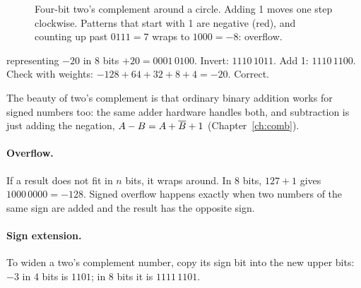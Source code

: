 \begin{figure}[h]
\centering
{}
\caption{Four-bit two's complement around a circle. Adding 1 moves one step clockwise. Patterns that start with 1 are negative (red), and counting up past $0111 = 7$ wraps to $1000 = -8$: overflow.}
\label{fig:twoswheel}
\end{figure}

\begin{worked}{representing $-20$ in 8 bits}
$+20 = 0001\,0100$. Invert: $1110\,1011$. Add 1: $1110\,1100$. Check with weights: $-128 + 64 + 32 + 8 + 4 = -20$. Correct.
\end{worked}

The beauty of two's complement is that ordinary binary addition works for signed numbers too: the same adder hardware handles both, and subtraction is just adding the negation, $A - B = A + \overline{B} + 1$ (Chapter~\ref{ch:comb}).

\paragraph{Overflow.} If a result does not fit in $n$ bits, it wraps around. In 8 bits, $127 + 1$ gives $1000\,0000 = -128$. Signed overflow happens exactly when two numbers of the same sign are added and the result has the opposite sign.

\paragraph{Sign extension.} To widen a two's complement number, copy its sign bit into the new upper bits: $-3$ in 4 bits is $1101$; in 8 bits it is $1111\,1101$.


